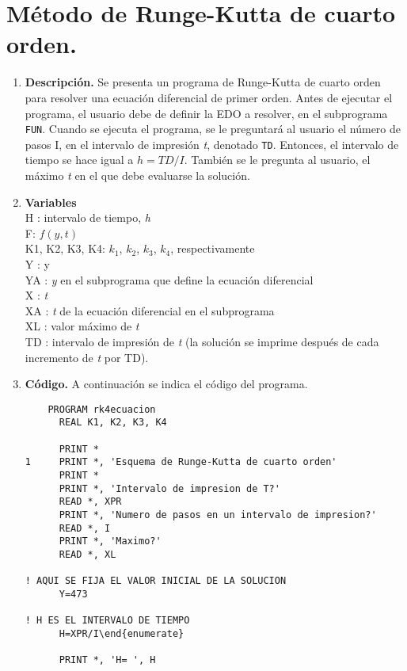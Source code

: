 \documentclass[11pt]{article}
\begin{document}
\section*{Método de Runge-Kutta de cuarto orden.}
\begin{enumerate}
\item \textbf{Descripción.}
Se presenta un programa de Runge-Kutta de cuarto orden para resolver una ecuación diferencial de primer orden. Antes de ejecutar el programa, el usuario debe de definir la EDO a resolver, en el subprograma \texttt{FUN}. Cuando se ejecuta el programa, se le preguntará al usuario el número de pasos I, en el intervalo de impresión \textit{t}, denotado \texttt{TD}. Entonces, el intervalo de tiempo se hace igual a $h = TD/I$. También se le pregunta al usuario, el máximo \textit{t} en el que debe evaluarse la solución.
\item \textbf{Variables} \\
H : intervalo de tiempo, \textit{h} \\
F: $f(y,t)$ \\
K1, K2, K3, K4: $k_{1}$, $k_{2}$, $k_{3}$, $k_{4}$, respectivamente \\
Y : y \\
YA : \textit{y} en el subprograma que define la ecuación diferencial \\
X : \textit{t} \\
XA : \textit{t} de la ecuación diferencial en el subprograma \\
XL : valor máximo de \textit{t} \\
TD : intervalo de impresión de \textit{t} (la solución se imprime después de cada incremento de \textit{t} por TD).
\item \textbf{Código.}
A continuación se indica el código del programa.\\
\begin{lstlisting}
	PROGRAM rk4ecuacion
      REAL K1, K2, K3, K4
      
      PRINT *
1     PRINT *, 'Esquema de Runge-Kutta de cuarto orden'
      PRINT *
      PRINT *, 'Intervalo de impresion de T?'
      READ *, XPR
      PRINT *, 'Numero de pasos en un intervalo de impresion?'
      READ *, I
      PRINT *, 'Maximo?'
      READ *, XL

! AQUI SE FIJA EL VALOR INICIAL DE LA SOLUCION
      Y=473

! H ES EL INTERVALO DE TIEMPO
      H=XPR/I\end{enumerate}

      PRINT *, 'H= ', H


\end{lstlisting}
\end{enumerate}
\end{document}
